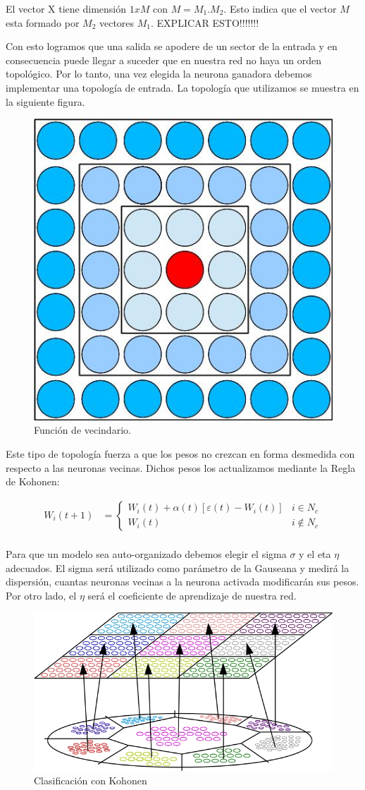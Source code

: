 El vector X tiene dimensión $1 x M$ con $M = M_{1} . M_{2}$. Esto indica que el vector $M$ esta formado por $M_{2}$ vectores $M_{1}$.
EXPLICAR ESTO!!!!!!!

Con esto logramos que una salida se apodere de un sector de la entrada y en consecuencia puede llegar a suceder que en nuestra red
no haya un orden topológico. Por lo tanto, una vez elegida la neurona ganadora debemos implementar una topología de entrada.
La topología que utilizamos se muestra en la siguiente figura.

\begin{figure}[ht!]
	\centering
	\includegraphics[width=0.3\linewidth]{img/parte2-vecindario.jpg}
	\caption{Función de vecindario.}
\end{figure}

Este tipo de topología fuerza a que los pesos no crezcan en forma desmedida con respecto a las neuronas vecinas. 
Dichos pesos los 
actualizamos mediante la Regla de Kohonen:

\begin{align*}
	W_{i}(t+1) &=  \begin{cases}
						W_{i}(t) + \alpha(t) [ \varepsilon(t) - W_{i}(t) ] & i \in N_{c} \\
						W_{i}(t)                                           & i \not \in N_{c}  
					\end{cases} \\
\end{align*}


Para que un modelo sea auto-organizado debemos elegir el sigma $\sigma$ y  el eta $\eta$ adecuados. El sigma será 
utilizado como parámetro de la Gauseana y medirá la dispersión, cuantas neuronas vecinas a la neurona activada modificarán 
sus pesos. Por otro lado, el $\eta$ será el coeficiente de aprendizaje de nuestra red.







\begin{figure}[ht!]
	\centering
	\includegraphics[width=0.8\linewidth]{img/parte2-kohonen9clases.jpg}
	\caption{Clasificación con Kohonen}
\end{figure}


